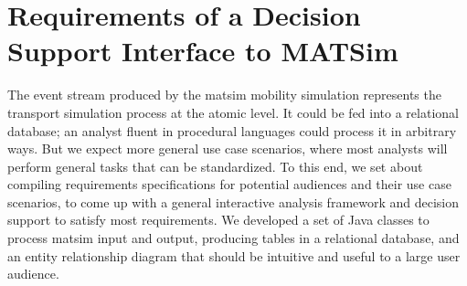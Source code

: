 \section{Requirements of a Decision Support Interface to MATSim}
\label{sec:analyticsRequirements}
The event stream produced by the \gls{matsim} mobility simulation represents the transport simulation process at the atomic level. It could be fed into a relational database; an analyst fluent in procedural languages could process it in arbitrary ways. But we expect more general use case scenarios, where most analysts will perform general tasks that can be standardized. To this end, we set about compiling requirements specifications for potential audiences and their use case scenarios, to come up with a general interactive analysis framework and decision support to satisfy most requirements. We developed a set of Java classes to process \gls{matsim} input and output, producing tables in a relational database, and an entity relationship diagram that should be intuitive and useful to a large user audience.

